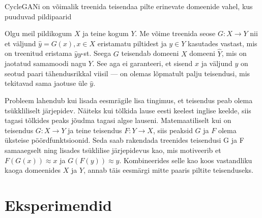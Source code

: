 \documentclass{vilgym}
\begin{document}
    
    CycleGANi on võimalik treenida teisendaa pilte erinevate domeenide vahel, kus puuduvad pildipaarid

    Olgu meil pildikogum $ X $ ja teine kogum $ Y $. Me võime treenida seose $ G: X \rightarrow Y $ nii et väljund $ \hat{y} = G(x), x \in X $ eristamatu piltidest ja $ y \in Y $ kasutades vastast, mis on treenitud eristama $ \hat{y} y $-st.
    Seega $ G $ teisendab domeeni $ X $ domeeni $ \hat{Y} $, mis on jaotatud samamoodi nagu $ Y $. See aga ei garanteeri, et sisend $ x $ ja väljund $ y $ on seotud paari tähendusrikkal viisil --- on olemas lõpmatult palju teisendusi, mis tekitavad sama jaotuse üle $ \hat{y} $.

    Probleem lahendub kui lisada eesmrägile lisa tingimus, et teisendus peab olema tsükkliliselt järjepidev. Näiteks kui tõlkida lause eesti keelest inglise keelde, siis tagasi tõlkides peaks jõudma tagasi algse lauseni. Matemaatiliselt kui on teisendus $ G: X \rightarrow Y $ ja teine teisendus $F: Y \rightarrow X $, siis peaksid $ G $ ja $ F $ olema üksteise pöördfunktsioonid.
    Seda saab rakendada treenides teisendusi G ja F samaaegselt ning lisades tsüklilise järjepidevus kao, mis motiveerib et $ F(G(x)) \approx x $ ja $ G(F(y)) \approx y $. Kombineerides selle kao koos vastandliku kaoga domeenides $ X $ ja $ Y $, annab täis eesmärgi mitte paaris piltite teisenduseks.


    \section{Eksperimendid}


    \nocite{*} %
    \printbibliography[title={Kasutatud allikad}]
\end{document}
